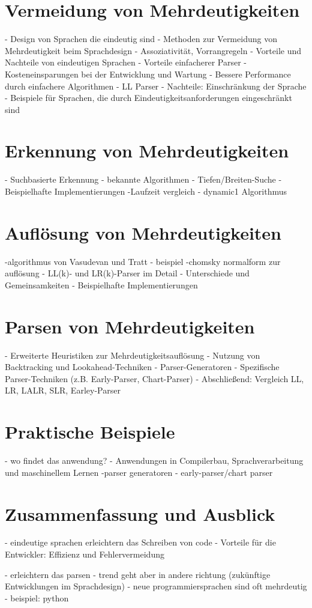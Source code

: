 \documentclass[runningheads]{llncs}
\begin{document}
\section{Vermeidung von Mehrdeutigkeiten}
- Design von Sprachen die eindeutig sind
- Methoden zur Vermeidung von Mehrdeutigkeit beim Sprachdesign
- Assoziativität, Vorrangregeln
- Vorteile und Nachteile von eindeutigen Sprachen
- Vorteile einfacherer Parser
- Kosteneinsparungen bei der Entwicklung und Wartung
- Bessere Performance durch einfachere Algorithmen
- LL Parser
- Nachteile: Einschränkung der Sprache
- Beispiele für Sprachen, die durch Eindeutigkeitsanforderungen eingeschränkt sind

\section{Erkennung von Mehrdeutigkeiten}
- Suchbasierte Erkennung
- bekannte Algorithmen
- Tiefen/Breiten-Suche
- Beispielhafte Implementierungen
-Laufzeit vergleich
- dynamic1 Algorithmus

\section{Auflösung von Mehrdeutigkeiten}
-algorithmus von Vasudevan und Tratt
- beispiel
-chomsky normalform zur auflösung
- LL(k)- und LR(k)-Parser im Detail
- Unterschiede und Gemeinsamkeiten
- Beispielhafte Implementierungen

\section{Parsen von Mehrdeutigkeiten}
- Erweiterte Heuristiken zur Mehrdeutigkeitsauflösung
- Nutzung von Backtracking und Lookahead-Techniken
- Parser-Generatoren
- Spezifische Parser-Techniken (z.B. Early-Parser, Chart-Parser)
- Abschließend: Vergleich LL, LR, LALR, SLR, Earley-Parser

\section{Praktische Beispiele}
- wo findet das anwendung?
- Anwendungen in Compilerbau, Sprachverarbeitung und maschinellem Lernen
-parser generatoren
- early-parser/chart parser

\section{Zusammenfassung und Ausblick}
- eindeutige sprachen erleichtern das Schreiben von code
- Vorteile für die Entwickler: Effizienz und Fehlervermeidung

- erleichtern das parsen
- trend geht aber in andere richtung (zukünftige Entwicklungen im Sprachdesign)
- neue programmiersprachen sind oft mehrdeutig
- beispiel: python

%
%
%


\end{document}
